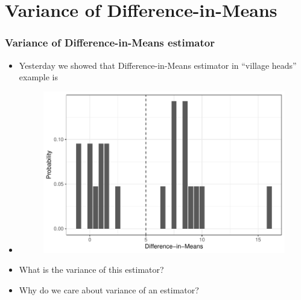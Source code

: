 \documentclass[table, xcolor = {dvipsnames}, 9pt]{beamer}
\theoremstyle{plain}
\begin{document}
\section{Variance of Difference-in-Means}
\begin{frame}
\frametitle{Variance of Difference-in-Means estimator} 
\begin{itemize}
\item Yesterday we showed that Difference-in-Means estimator in ``village heads'' example is 
\item[]
\begin{figure}[H]
\includegraphics[width=0.9\linewidth]{cra_est_dist_plot.pdf}
\end{figure} 
\item What is the variance of this estimator?  
\item Why do we care about variance of an estimator?
\end{itemize}
\end{frame}
\end{document}
